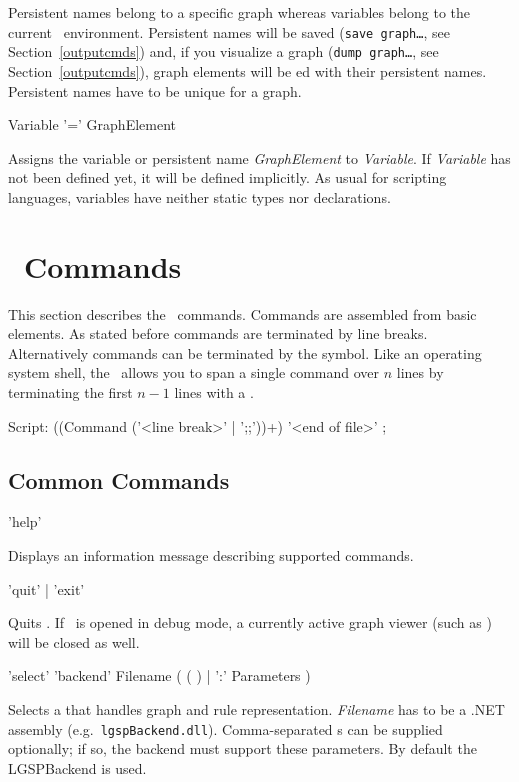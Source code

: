 \begin{note}
Persistent names belong to a specific graph whereas variables belong to the current \GrShell\ environment. Persistent names will be saved (\texttt{save graph\dots}, see Section~\ref{outputcmds}) and, if you visualize a graph (\texttt{dump graph\dots}, see Section~\ref{outputcmds}), graph elements will be ed with their persistent names. Persistent names have to be unique for a graph.
\end{note}

\begin{rail}
  Variable '=' GraphElement   
\end{rail}
Assigns the variable or persistent name \emph{GraphElement} to \emph{Variable}. If \emph{Variable} has not been defined yet, it will be defined implicitly. As usual for scripting languages, variables have neither static types nor declarations.

\section{\GrShell\ Commands}
This section describes the \GrShell\ commands. Commands are assembled from basic elements. 
As stated before commands are terminated by line breaks. Alternatively commands can be terminated by the \indexed{\texttt{;;}} symbol.
Like an operating system shell, the \GrShell\ allows you to span a single command over $n$ lines by terminating the first $n-1$ lines with a .  
\begin{rail}
  Script: ((Command ('<line break>' | ';;'))+) '<end of file>' ;
\end{rail}

\subsection{Common Commands}
\label{commcommands}
\begin{rail}
  'help'
\end{rail}
Displays an information message describing supported commands. 

\begin{rail}
  'quit' | 'exit'
\end{rail}
Quits \GrShell. If \GrShell\ is opened in debug mode, a currently active graph viewer (such as \yComp) will be closed as well.

\begin{rail}
  'select' 'backend' Filename ( ( ) | ':' Parameters )
\end{rail}
Selects a  that handles graph and rule representation. \emph{Filename} has to be a .NET assembly (e.g.\ \texttt{lgspBackend.dll}).
Comma-separated s can be supplied optionally; if so, the backend must support these parameters.
By default the LGSPBackend is used.

